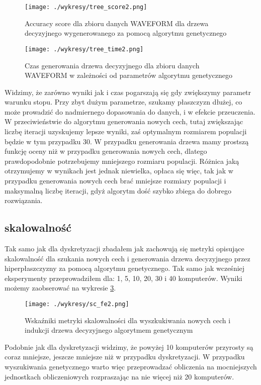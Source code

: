 \documentclass[magisterska]{pracamgr}
\theoremstyle{plain}
\theoremstyle{definition}
\theoremstyle{remark}
\begin{document}
  
\begin{figure}
 \caption{Accuracy score dla zbioru danych WAVEFORM dla drzewa decyzyjnego wygenerowanego za pomocą algorytmu genetycznego}\label{fig:tree_score}
 \centering\texttt{[image: ./wykresy/tree\_score2.png]}
\end{figure}

\begin{figure}
 \caption{Czas generowania drzewa decyzyjnego dla zbioru danych WAVEFORM w zależności od parametrów algorytmu genetycznego}\label{fig:tree_time}
 \centering\texttt{[image: ./wykresy/tree\_time2.png]}
\end{figure}

Widzimy, że zarówno wyniki jak i czas pogarszają się gdy zwiększymy parametr warunku stopu. Przy zbyt dużym parametrze, 
szukamy płaszczyzn dłużej, co może prowadzić do nadmiernego dopasowania do danych, i w efekcie przeuczenia.
W przeciwieństwie do algorytmu generowania nowych cech, tutaj zwiększając liczbę iteracji uzyskujemy lepsze wyniki,
zaś optymalnym rozmiarem populacji będzie w tym przypadku 30. W przypadku generowania drzewa mamy prostszą funkcję
oceny niż w przypadku generowania nowych cech, dlatego prawdopodobnie potrzebujemy mniejszego rozmiaru populacji.
Różnica jaką otrzymujemy w wynikach jest jednak niewielka, opłaca się więc, tak jak w przypadku generowania nowych cech
brać mniejsze rozmiary populacji i maksymalną liczbę iteracji, gdyż algorytm dość szybko zbiega do dobrego rozwiązania.

\subsection{skalowalność}
Tak samo jak dla dyskretyzacji zbadałem jak zachowują się metryki opisujące skalowalność dla szukania nowych cech i generowania
drzewa decyzyjnego przez hiperpłaszczyzny za pomocą algorytmu genetycznego. Tak samo jak wcześniej eksperymenty
przeprowadziłem dla: 1, 5, 10, 20, 30 i 40 komputerów. Wyniki możemy zaobserować na wykresie \ref{fig:sc_fe}.

\begin{figure}
 \caption{Wskaźniki metryki skalowalności dla wyszkukiwania nowych cech i indukcji drzewa decyzyjnego algorytmem genetycznym}\label{fig:sc_fe}
 \centering\texttt{[image: ./wykresy/sc\_fe2.png]}
\end{figure}

Podobnie jak dla dyskretyzacji widzimy, że powyżej 10 komputerów przyrosty są coraz mniejsze, jeszcze mniejsze niż w przypadku
dyskretyzacji. W przypadku wyszukiwania genetycznego warto więc przeprowadzać obliczenia na mocniejszych jednostkach obliczeniowych
rozpraszając na nie więcej niż 20 komputerów.
\newpage
\end{document}
